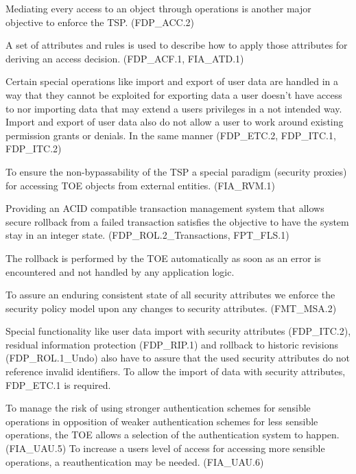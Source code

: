 \documentclass[12pt,english]{scrbook}
\begin{document}

    Mediating every access to an object through operations is another major
    objective to enforce the TSP. (FDP\_ACC.2)

    A set of attributes and rules is used to describe how to apply those
    attributes for deriving an access decision. (FDP\_ACF.1, FIA\_ATD.1)  

    Certain special operations like import and export of user data are handled
    in a way that they cannot be exploited for exporting data a user doesn't
    have access to nor importing data that may extend a users privileges in a
    not intended way. Import and export of user data also do not allow a user
    to work around existing permission grants or denials. In the same manner (FDP\_ETC.2,
    FDP\_ITC.1, FDP\_ITC.2)

    To ensure the non-bypassability of the TSP a special paradigm (security
    proxies) for accessing TOE objects from external entities. (FIA\_RVM.1)
    

    Providing an ACID compatible transaction management system that allows
    secure rollback from a failed transaction satisfies the objective to have
    the system stay in an integer state. (FDP\_ROL.2\_Transactions, FPT\_FLS.1)

    The rollback is performed by the TOE automatically as soon as an error is
    encountered and not handled by any application logic.


    To assure an enduring consistent state of all security attributes we
    enforce the security policy model upon any changes to security attributes.
    (FMT\_MSA.2)

    Special functionality like user data import with security attributes
    (FDP\_ITC.2), residual information protection (FDP\_RIP.1) and rollback to
    historic revisions (FDP\_ROL.1\_Undo) also have to assure that the used
    security attributes do not reference invalid identifiers. To allow the
    import of data with security attributes, FDP\_ETC.1 is required.
    

    To manage the risk of using stronger authentication schemes for sensible
    operations in opposition of weaker authentication schemes for less sensible
    operations, the TOE allows a selection of the authentication system to
    happen. (FIA\_UAU.5) To increase a users level of access for accessing more
    sensible operations, a reauthentication may be needed. (FIA\_UAU.6)
    
\end{document}
